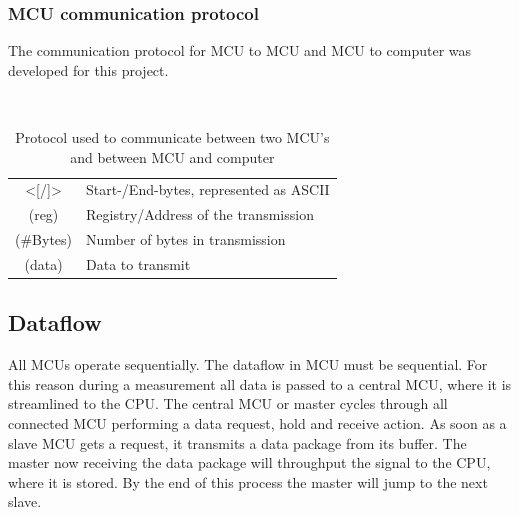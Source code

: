 \subsubsection{MCU communication protocol}

The communication protocol for \ac{MCU} to \ac{MCU} and \ac{MCU} to computer was developed for this project.

\begin{table}[!htb]
    \centering
    
    \\[0.5em]
    \footnotesize
		\begin{tabular}{c@{ :\hskip 0.5em}l}
			\toprule
            \large{\textcolor{WesMixL8qual6}{<[}/\textcolor{WesMixL8qual6}{]>}} & Start-/End-bytes, represented as \ac{ASCII}\\
            \textcolor{WesMixL8qual0}{\large (reg)} & Registry/Address of the transmission\\
            \textcolor{WesMixL8qual4}{\large (\#Bytes)} & Number of bytes in transmission\\
            \textcolor{WesMixL8qual5}{\large (data)} & Data to transmit\\
			\bottomrule
		\end{tabular}
	\normalsize
    \caption[MCU communication protocol]{Protocol used to communicate between two MCU's and between MCU and computer}
    \label{tab:mcu_com_protocol}
\end{table}





\subsection{Dataflow}

All \acs{MCU}s operate sequentially.
The dataflow in \ac{MCU} must be sequential. For this reason during a measurement all data is passed to a central \ac{MCU}, where it is streamlined to the \ac{CPU}. The central \ac{MCU} or master cycles through all connected \ac{MCU} performing a data request, hold and receive action. As soon as a slave \ac{MCU} gets a request, it transmits a data package from its buffer. The master now receiving the data package will throughput the signal to the \ac{CPU}, where it is stored. By the end of this process the master will jump to the next slave.

